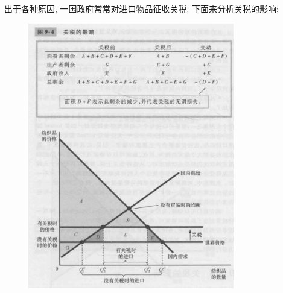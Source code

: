 出于各种原因, 一国政府常常对进口物品征收关税. 下面来分析关税的影响: 

\begin{figure}[H]
	\centering
	\includegraphics[width=9cm]{attachment/Fig9_4.png}
\end{figure}







